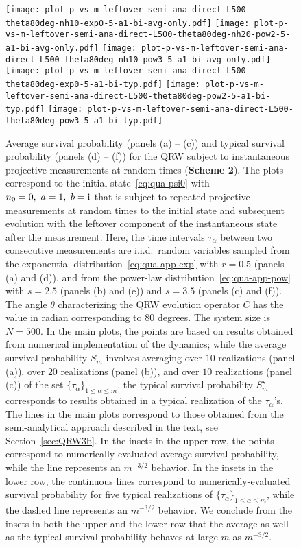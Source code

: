 \documentclass[12pt]{iopart}
\begin{document}
\begin{figure}[!htbp]
\centering
\texttt{[image: plot-p-vs-m-leftover-semi-ana-direct-L500-theta80deg-nh10-exp0-5-a1-bi-avg-only.pdf]} \hskip1pt
\texttt{[image: plot-p-vs-m-leftover-semi-ana-direct-L500-theta80deg-nh20-pow2-5-a1-bi-avg-only.pdf]} \hskip1pt
\texttt{[image: plot-p-vs-m-leftover-semi-ana-direct-L500-theta80deg-nh10-pow3-5-a1-bi-avg-only.pdf]} \\[2ex]
\texttt{[image: plot-p-vs-m-leftover-semi-ana-direct-L500-theta80deg-exp0-5-a1-bi-typ.pdf]} \hskip1pt
\texttt{[image: plot-p-vs-m-leftover-semi-ana-direct-L500-theta80deg-pow2-5-a1-bi-typ.pdf]} \hskip1pt
\texttt{[image: plot-p-vs-m-leftover-semi-ana-direct-L500-theta80deg-pow3-5-a1-bi-typ.pdf]}
        \caption{Average survival probability (panels (a) -- (c)) and
        typical survival probability (panels (d) -- (f)) for the QRW subject to instantaneous projective measurements at random times
(\textbf{Scheme 2}). The plots correspond to the initial state~\eqref{eq:qua-psi0}
with $n_0=0,~a=1,~b={\rm i}$ that is subject to repeated projective
measurements at random times to the initial state and subsequent
        evolution with the leftover component of the instantaneous
        state after the measurement. Here, the time intervals $\tau_\alpha$ between two consecutive
measurements are i.i.d.~random variables sampled from the exponential
        distribution~\eqref{eq:qua-app-exp} with $r=0.5$ (panels (a) and
        (d)), and
from the power-law distribution~\eqref{eq:qua-app-pow} with
        $s=2.5$ (panels (b) and (e)) and $s=3.5$ (panels (c) and (f)). The angle $\theta$ characterizing the
        QRW evolution operator $C$ has the
        value in radian corresponding to $80$ degrees. The system size
        is $N=500$. In the main plots, the points are based on results
        obtained from numerical implementation of the dynamics; while
        the average survival probability $\overline{S_m}$ involves
        averaging over $10$ realizations (panel (a)), over $20$ realizations (panel (b)), and over $10$ realizations (panel (c)) of the set $\{\tau_\alpha\}_{1\le
        \alpha \le m}$, the typical survival probability $S_m^\star$
        corresponds to results obtained in a typical realization of the
        $\tau_\alpha$'s. The lines in the main plots correspond to those
        obtained from the semi-analytical approach described in the
        text, see Section~\ref{sec:QRW3b}. In the insets in the upper
        row, the points correspond to numerically-evaluated average
        survival probability, while the line represents an $m^{-3/2}$
        behavior. In the insets in the lower
        row, the continuous lines correspond to numerically-evaluated
        survival probability for five typical realizations of
        $\{\tau_\alpha\}_{1\le \alpha \le m}$, while the dashed line
        represents an $m^{-3/2}$ behavior. We conclude from the insets
        in both the upper and the lower row that the average as well as the typical
        survival probability behaves at large $m$ as $m^{-3/2}$.}
\label{fig:qua-qrw-scheme2}
\end{figure}
\end{document}
